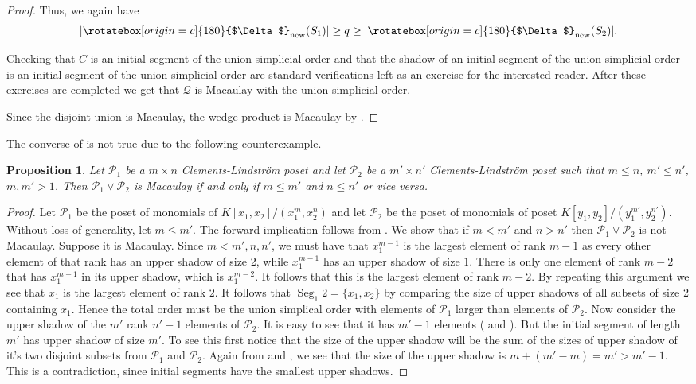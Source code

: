 \documentclass[11pt, reqno]{amsart}
\renewcommand{\P}{{\mathcal P}}
\newcommand{\uSdw}{\rotatebox[origin=c]{180}{$\Delta$}}
\def\Seg{\operatorname{Seg}}
\theoremstyle{plain} %
\newtheorem{prop}[thm]{Proposition}
\theoremstyle{definition}
\theoremstyle{remark}
\numberwithin{equation}{section}  %
\begin{document}
\begin{proof}
 Thus, we again have 
\[ |\uSdw_{\text{new}}(S_1)| \geq q \geq |\uSdw_{\text{new}}(S_2)|.\]


	Checking that $C$ is an initial segment of the union simplicial order and that the shadow of an initial segment of the union simplicial order
	is an initial segment of the union simplicial order
	are standard verifications left as an exercise for the interested reader.
	After these exercises are completed we get that $\mathcal{Q}$ is Macaulay with the union simplicial order.

Since the disjoint union is Macaulay, the wedge product is Macaulay by .
\end{proof}

The converse of  is not true due to the following counterexample. 



\begin{prop}\label{prop: wedge box classification}
    Let $\P_1$ be  a $m\times n$ Clements-Lindstr\"om poset and let  $\P_2$ be a $m'\times n'$ Clements-Lindstr\"om poset such that $m \leq n$, $m' \leq n'$, $m,m' > 1$. 
    Then $\P_1 \vee \P_2$ is Macaulay if and only if $m \leq m'$ and $n \leq n'$ or vice versa.
\end{prop}
\begin{proof}
Let $\P_1$ be the poset of monomials of $K[x_1,x_2]/(x_1^m,x_2^n)$ and let $\P_2$ be the poset of monomials of poset $K[y_1,y_2]/(y_1^{m'},y_2^{n'})$. 
Without loss of generality, let $m \leq m'$. The forward implication follows from . We show that if $m < m'$ and $n > n'$ then $\P_1 \vee \P_2$ is not Macaulay. Suppose it is Macaulay. Since $m < m',n,n'$, we must have that $x_1^{m-1}$ is the largest element of rank $m-1$ as every other element of that rank has an upper shadow of size 2, while $x_1^{m-1}$ has an upper shadow of size $1$. There is only one element of rank $m-2$ that has $x_1^{m-1}$ in its upper shadow, which is $x_1^{m-2}$. It follows that this is the largest element of rank $m-2$. By repeating this argument we see that $x_1$ is the largest element of rank $2$. It follows that $\Seg_1 2 = \{ x_1,x_2\} $ by comparing the size of upper shadows of all subsets of size 2 containing $x_1$. Hence  the total order must be the union simplical order  with elements of $\P_1$ larger than elements of $\P_2$. Now consider the upper shadow of the $m'$ rank $n'-1$ elements of $\P_2$. It is easy to see that it has $m'-1$ elements ( and ). But the initial segment of length $m'$ has upper shadow of size $m'$. To see this first notice that the size of the upper shadow will be the sum of the sizes of upper shadow of it's two disjoint subsets from $\P_1$ and $\P_2$. Again from  and , we see that the size of the upper shadow is $m + (m' - m) = m' > m' - 1$. This is a contradiction, since initial segments have the smallest upper shadows.
\end{proof}
\end{document}
